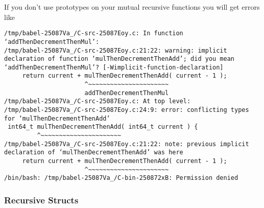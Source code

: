 \documentclass[11pt]{article}
\begin{document}
If you don't use prototypes on your mutual recursive functions you will get errors like

\begin{verbatim}
/tmp/babel-25087Va_/C-src-25087Eoy.c: In function ‘addThenDecrementThenMul’:
/tmp/babel-25087Va_/C-src-25087Eoy.c:21:22: warning: implicit declaration of function ‘mulThenDecrementThenAdd’; did you mean ‘addThenDecrementThenMul’? [-Wimplicit-function-declaration]
     return current + mulThenDecrementThenAdd( current - 1 );
                      ^~~~~~~~~~~~~~~~~~~~~~~
                      addThenDecrementThenMul
/tmp/babel-25087Va_/C-src-25087Eoy.c: At top level:
/tmp/babel-25087Va_/C-src-25087Eoy.c:24:9: error: conflicting types for ‘mulThenDecrementThenAdd’
 int64_t mulThenDecrementThenAdd( int64_t current ) {
         ^~~~~~~~~~~~~~~~~~~~~~~
/tmp/babel-25087Va_/C-src-25087Eoy.c:21:22: note: previous implicit declaration of ‘mulThenDecrementThenAdd’ was here
     return current + mulThenDecrementThenAdd( current - 1 );
                      ^~~~~~~~~~~~~~~~~~~~~~~
/bin/bash: /tmp/babel-25087Va_/C-bin-250872xB: Permission denied
\end{verbatim}
\subsubsection{Recursive Structs}
\label{sec:org4d87e1e}
\end{document}

